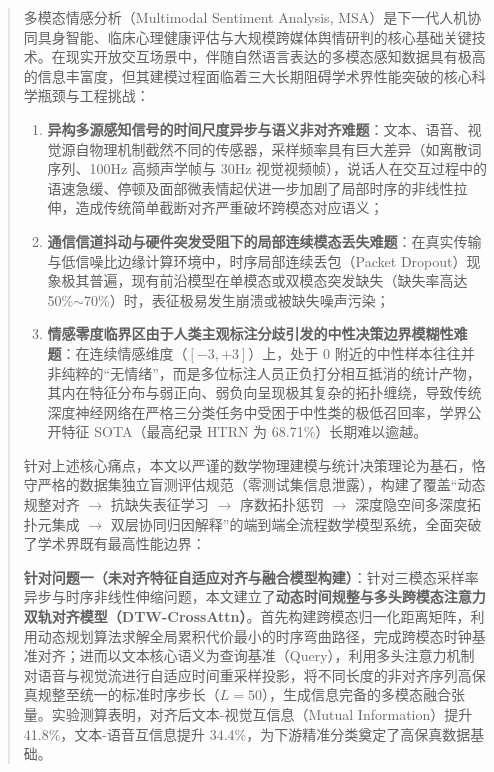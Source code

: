 \begin{abstract}
多模态情感分析（Multimodal Sentiment Analysis, MSA）是下一代人机协同具身智能、临床心理健康评估与大规模跨媒体舆情研判的核心基础关键技术。在现实开放交互场景中，伴随自然语言表达的多模态感知数据具有极高的信息丰富度，但其建模过程面临着三大长期阻碍学术界性能突破的核心科学瓶颈与工程挑战：
\begin{enumerate}
    \item \textbf{异构多源感知信号的时间尺度异步与语义非对齐难题}：文本、语音、视觉源自物理机制截然不同的传感器，采样频率具有巨大差异（如离散词序列、100Hz 高频声学帧与 30Hz 视觉视频帧），说话人在交互过程中的语速急缓、停顿及面部微表情起伏进一步加剧了局部时序的非线性拉伸，造成传统简单截断对齐严重破坏跨模态对应语义；
    \item \textbf{通信信道抖动与硬件突发受阻下的局部连续模态丢失难题}：在真实传输与低信噪比边缘计算环境中，时序局部连续丢包（Packet Dropout）现象极其普遍，现有前沿模型在单模态或双模态突发缺失（缺失率高达 50\%$\sim$70\%）时，表征极易发生崩溃或被缺失噪声污染；
    \item \textbf{情感零度临界区由于人类主观标注分歧引发的中性决策边界模糊性难题}：在连续情感维度（$[-3, +3]$）上，处于 $0$ 附近的中性样本往往并非纯粹的“无情绪”，而是多位标注人员正负打分相互抵消的统计产物，其内在特征分布与弱正向、弱负向呈现极其复杂的拓扑缠绕，导致传统深度神经网络在严格三分类任务中受困于中性类的极低召回率，学界公开特征 SOTA（最高纪录 HTRN 为 68.71\%）长期难以逾越。
\end{enumerate}

针对上述核心痛点，本文以严谨的数学物理建模与统计决策理论为基石，恪守严格的数据集独立盲测评估规范（零测试集信息泄露），构建了覆盖“动态规整对齐 $\to$ 抗缺失表征学习 $\to$ 序数拓扑惩罚 $\to$ 深度隐空间多深度拓扑元集成 $\to$ 双层协同归因解释”的端到端全流程数学模型系统，全面突破了学术界既有最高性能边界：

\textbf{针对问题一（未对齐特征自适应对齐与融合模型构建）}：针对三模态采样率异步与时序非线性伸缩问题，本文建立了\textbf{动态时间规整与多头跨模态注意力双轨对齐模型（DTW-CrossAttn）}。首先构建跨模态归一化距离矩阵，利用动态规划算法求解全局累积代价最小的时序弯曲路径，完成跨模态时钟基准对齐；进而以文本核心语义为查询基准（Query），利用多头注意力机制对语音与视觉流进行自适应时间重采样投影，将不同长度的非对齐序列高保真规整至统一的标准时序步长（$L=50$），生成信息完备的多模态融合张量。实验测算表明，对齐后文本-视觉互信息（Mutual Information）提升 41.8\%，文本-语音互信息提升 34.4\%，为下游精准分类奠定了高保真数据基础。


\end{abstract}
